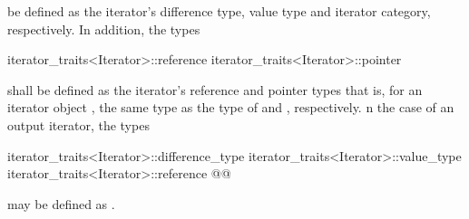 be defined as the iterator's difference type, value type and iterator category, respectively.
In addition, the types

%
%
\begin{codeblock}
iterator_traits<Iterator>::reference
iterator_traits<Iterator>::pointer
\end{codeblock}

shall be defined as the iterator's reference and pointer types\changed{,}{;} that is, for an
iterator object , the same type as the type of  and ,
respectively. n the case of an output
iterator, the types

\begin{codeblock}
iterator_traits<Iterator>::difference_type
iterator_traits<Iterator>::value_type
iterator_traits<Iterator>::reference
@@
\end{codeblock}

may be defined as .

